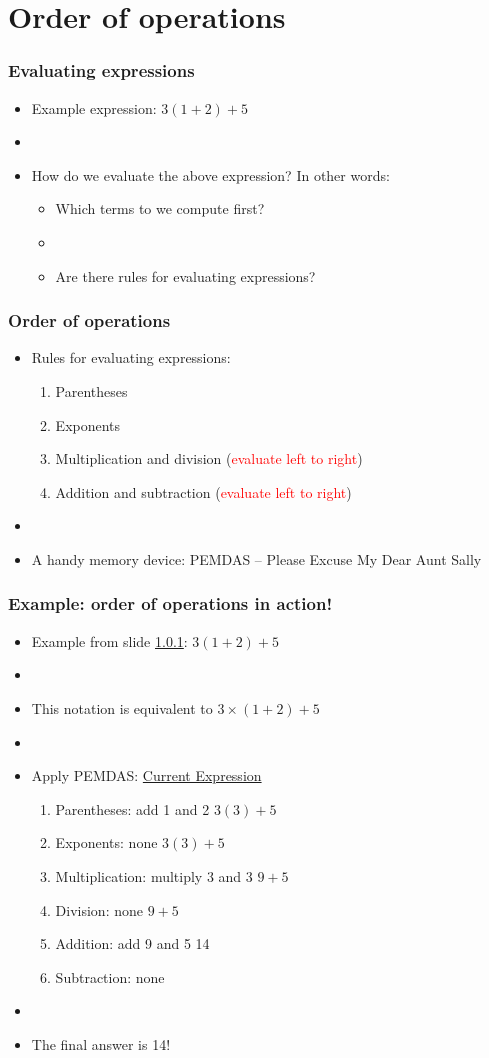 \documentclass[11pt,dvipsnames]{beamer}
\newcommand{\myframe}[1]{\begin{frame} \frametitle{#1}}
\begin{document}
\section{Order of operations}
\myframe{Evaluating expressions}\label{ex:oo1}
\begin{itemize}
\item Example expression: $3(1 + 2) + 5$
\item[]
\item How do we evaluate the above expression? In other words: \pause
\begin{itemize}
\item Which terms to we compute first?
\item[] \pause
\item Are there rules for evaluating expressions?
\end{itemize}
\end{itemize}
\end{frame}

\myframe{Order of operations}
\begin{itemize}
\item Rules for evaluating expressions:
\begin{enumerate}
\item Parentheses
\item Exponents
\item Multiplication and division (\textcolor{red}{evaluate left to right})
\item Addition and subtraction (\textcolor{red}{evaluate left to right})
\end{enumerate}
\item[] \pause
\item A handy memory device: PEMDAS -- Please Excuse My Dear Aunt Sally
\end{itemize}
\end{frame}

\myframe{Example: order of operations in action!}
\begin{itemize}
\item Example from slide \ref{ex:oo1}: $3(1 + 2) + 5$
\item[]
\item This notation is equivalent to $3\times (1+2) + 5$
\item[] \pause
\item Apply PEMDAS: \hfill \underline{Current Expression}
\begin{enumerate}
\item Parentheses: add 1 and 2 \hfill $3(3) + 5$ \pause
\item Exponents: none \hfill $3(3) + 5$ \pause
\item Multiplication: multiply 3 and 3 \hfill $9 + 5$ \pause
\item Division: none \hfill $9 + 5$ \pause
\item Addition: add 9 and 5 \hfill 14 \pause
\item Subtraction: none \pause
\end{enumerate}
\item[]
\item The final answer is 14!
\end{itemize}
\end{frame}
\end{document}
